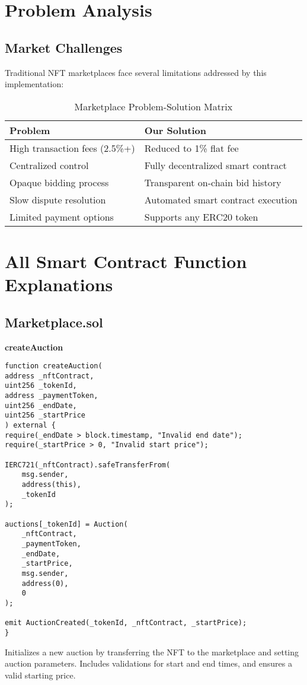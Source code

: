 \documentclass{article}
\begin{document}
\section{Problem Analysis}

\subsection{Market Challenges}
Traditional NFT marketplaces face several limitations addressed by this implementation:

\begin{table}[h]
\centering
\begin{tabular}{p{5cm} p{5cm}}
\toprule
\textbf{Problem} & \textbf{Our Solution} \\
\midrule
High transaction fees (2.5\%+) & Reduced to 1\% flat fee \\
Centralized control & Fully decentralized smart contract \\
Opaque bidding process & Transparent on-chain bid history \\
Slow dispute resolution & Automated smart contract execution \\
Limited payment options & Supports any ERC20 token \\
\bottomrule
\end{tabular}
\caption{Marketplace Problem-Solution Matrix}
\end{table}

\section{All Smart Contract Function Explanations}

\subsection{Marketplace.sol}

\textbf{createAuction}
\begin{lstlisting}[language=Solidity]
function createAuction(
address _nftContract,
uint256 _tokenId,
address _paymentToken,
uint256 _endDate,
uint256 _startPrice
) external {
require(_endDate > block.timestamp, "Invalid end date");
require(_startPrice > 0, "Invalid start price");

IERC721(_nftContract).safeTransferFrom(
    msg.sender,
    address(this),
    _tokenId
);

auctions[_tokenId] = Auction(
    _nftContract,
    _paymentToken,
    _endDate,
    _startPrice,
    msg.sender,
    address(0),
    0
);

emit AuctionCreated(_tokenId, _nftContract, _startPrice);
}
\end{lstlisting}
Initializes a new auction by transferring the NFT to the marketplace and setting auction parameters. Includes validations for start and end times, and ensures a valid starting price.
\end{document}
